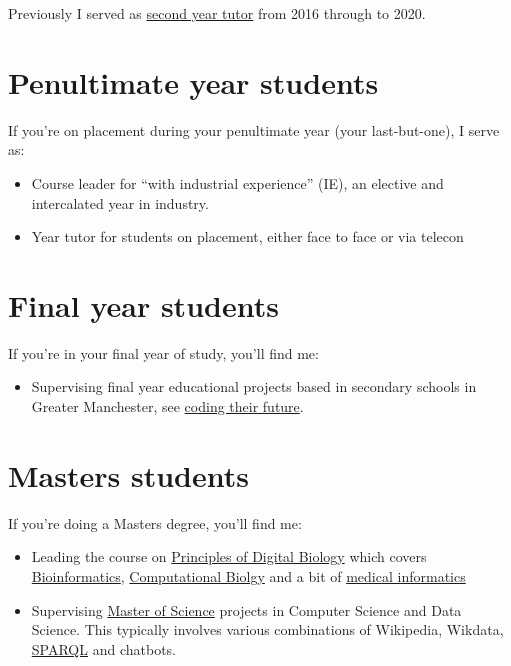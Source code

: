 \documentclass[
  12pt,
]{book}
\providecommand{\tightlist}{%
  \setlength{\itemsep}{0pt}\setlength{\parskip}{0pt}}
\begin{document}
Previously I served as \href{https://studentnet.cs.manchester.ac.uk/ugt/year2/}{second year tutor} from 2016 through to 2020.

\hypertarget{penultimate}{%
\section{Penultimate year students}\label{penultimate}}

If you're on placement during your penultimate year (your last-but-one), I serve as:

\begin{itemize}
\tightlist
\item
  Course leader for ``with industrial experience'' (IE), an elective and intercalated year in industry.
\item
  Year tutor for students on placement, either face to face or via telecon
\end{itemize}

\hypertarget{finalyear}{%
\section{Final year students}\label{finalyear}}

If you're in your final year of study, you'll find me:

\begin{itemize}
\tightlist
\item
  Supervising final year educational projects based in secondary schools in Greater Manchester, see \href{http://www.cs.man.ac.uk/~hulld/coding-their-future.html}{coding their future}. \citep{computinged} 👩‍💻👨‍💻
\end{itemize}

\hypertarget{masters}{%
\section{Masters students}\label{masters}}

If you're doing a Masters degree, you'll find me:

\begin{itemize}
\tightlist
\item
  Leading the course on \href{http://studentnet.cs.manchester.ac.uk/pgt/COMP60532/syllabus/}{Principles of Digital Biology} which covers \href{https://en.wikipedia.org/wiki/Bioinformatics}{Bioinformatics}, \href{https://en.wikipedia.org/wiki/Computational_biology}{Computational Biolgy} and a bit of \href{https://en.wikipedia.org/wiki/Health_informatics}{medical informatics} 🧬
\item
  Supervising \href{https://www.cs.manchester.ac.uk/study/masters/}{Master of Science} projects in Computer Science and Data Science. \citep{r4ds} This typically involves various combinations of Wikipedia, Wikdata, \href{https://en.wikipedia.org/wiki/SPARQL}{SPARQL} \citep{ducharme} and chatbots. 🤖 \citep{myca}
\end{itemize}
\end{document}
